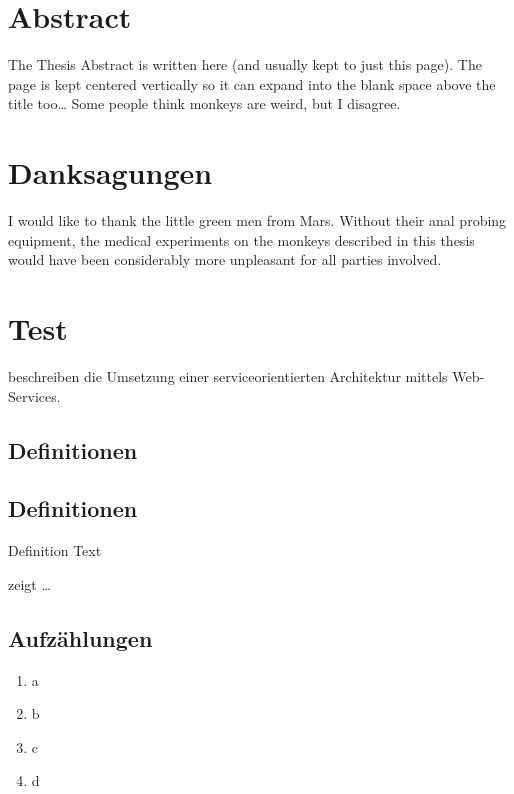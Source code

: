 \documentclass[paper=a5,twoside,fontsize=10pt, DIV=calc, headings=small,bibliography=totoc, listof=totoc]{scrbook}
\begin{document}
\chapter*{Abstract}
The Thesis Abstract is written here (and usually kept to just this page). The page is kept centered vertically so it can expand into the blank space above the title too\ldots
Some people think monkeys are weird, but I disagree.
\clearpage

\chapter*{Danksagungen}
I would like to thank the little green men from Mars. Without their anal probing equipment, the medical experiments on the monkeys described in this thesis would have been considerably more unpleasant for all parties involved.
\clearpage

\pagestyle{scrheadings}

\chapter{Test}
\label{chap:test}

\citeauthor{WSPA} \cite{WSPA} beschreiben die Umsetzung einer serviceorientierten Architektur mittels Web-Services.

\section{Definitionen}
\section{Definitionen}
\begin{definition}[Title]
\label{def:def1}
Definition Text
\end{definition}

 zeigt \ldots


\section{Aufzählungen}
\begin{enumerate}[label=\alph*)]
\item a
\item b
\item c
\item d
\end{enumerate}
\end{document}
